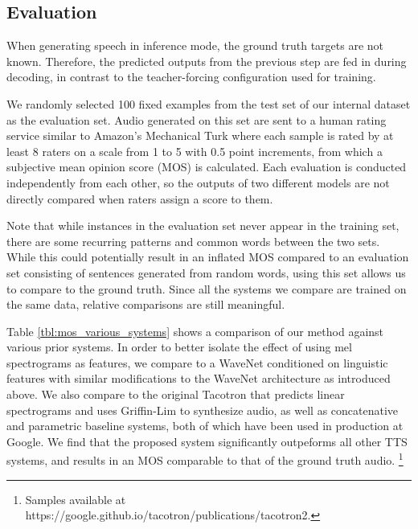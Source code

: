 \subsection{Evaluation}

When generating speech in inference mode, the ground truth targets are
not known.  Therefore, the predicted outputs from the previous step
are fed in during decoding, in contrast to the teacher-forcing
configuration used for training.

We randomly selected 100 fixed examples from the test set of our internal
dataset as the evaluation set.
Audio generated on this set are sent to a human rating service similar to
Amazon's Mechanical Turk where each sample is rated by at least 8 raters on a
scale from 1 to 5 with 0.5 point increments, from which a subjective mean opinion score
(MOS) is calculated. Each evaluation is conducted independently from each other,
so the outputs of two different models are not directly compared when
raters assign a score to them.

Note that while instances in the evaluation set never appear in the training
set, there are some recurring patterns and common words between the two sets.
While this could potentially result in an inflated MOS compared to
an evaluation set consisting of sentences generated from random words, using
this set allows us to compare to the ground truth.  Since all the systems
we compare are trained on the same data, relative comparisons are still
meaningful.

Table \ref{tbl:mos_various_systems} shows
a comparison of our method against various prior systems.
In order to better isolate the effect of using mel spectrograms as features,
we compare to a WaveNet conditioned on linguistic features\cite{45774} with similar
modifications to the WaveNet architecture as introduced above. We also compare
to the original
Tacotron that predicts linear spectrograms and uses Griffin-Lim to synthesize
audio, as well as concatenative \cite{gonzalvo2016recent} and parametric
\cite{zen2016fast} baseline systems, both of which have been used in production at Google.
%
We find that the proposed system significantly outpeforms all other TTS systems,
and results in an MOS comparable to that of the ground truth audio.
\footnote[2]{Samples available at https://google.github.io/tacotron/publications/tacotron2.}

